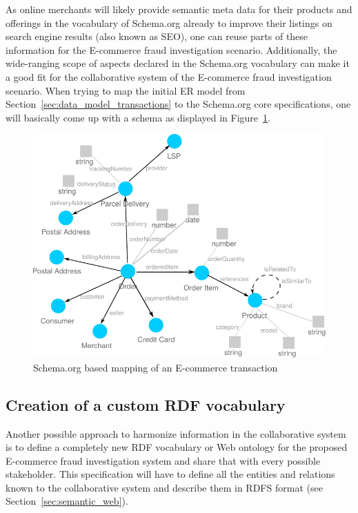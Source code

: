 As online merchants will likely provide semantic meta data for their products and offerings in the vocabulary of Schema.org already to improve their listings on search engine results (also known as \gls{SEO}), one can reuse parts of these information for the \gls{E-commerce} fraud investigation scenario. Additionally, the wide-ranging scope of aspects declared in the Schema.org vocabulary can make it a good fit for the collaborative system of the \gls{E-commerce} fraud investigation scenario. When trying to map the initial \gls{ER} model from Section~\ref{sec:data_model_transactions} to the Schema.org core specifications, one will basically come up with a schema as displayed in Figure~\ref{fig:images_schema_org}. \@

\begin{figure}[H]
	\centering
		\includegraphics[width=0.8\columnwidth]{images/schema_org_mapping.pdf}
	\caption{Schema.org based mapping of an \gls{E-commerce} transaction}
\label{fig:images_schema_org}
\end{figure}


\subsection{Creation of a custom \gls{RDF} vocabulary}
\label{subsec:build_ontology_frauds}

Another possible approach to harmonize information in the collaborative system is to define a completely new \gls{RDF} vocabulary or Web ontology for the proposed \gls{E-commerce} fraud investigation system and share that with every possible stakeholder. This specification will have to define all the entities and relations known to the collaborative system and describe them in \gls{RDFS} format (see Section~\ref{sec:semantic_web}). \\

